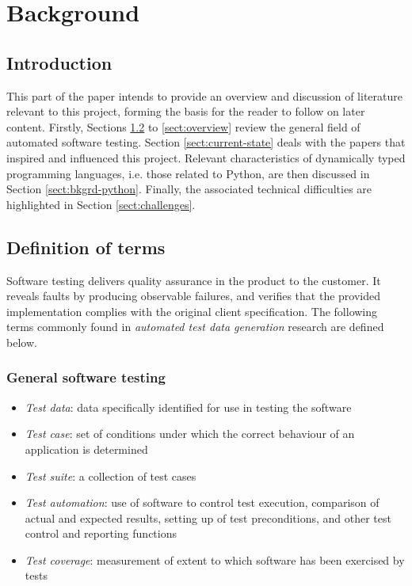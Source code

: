 \documentclass{icldt}
\numberwithin{equation}{section}       %
\newcommand{\blankpage}{
\newpage
\thispagestyle{empty}
\mbox{}
\newpage
}
\begin{document}
	
	\blankpage
	
	\blankpage
	
	\blankpage
	\tableofcontents
	
\chapter{Background}
\label{ch:background}
\section{Introduction}
This part of the paper intends to provide an overview and discussion of literature relevant to this project, forming the basis for the reader to follow on later content. Firstly, Sections \ref{sect:basics} to \ref{sect:overview} review the general field of automated software testing. Section \ref{sect:current-state} deals with the papers that inspired and influenced this project. Relevant characteristics of dynamically typed programming languages, i.e. those related to Python, are then discussed in Section \ref{sect:bkgrd-python}. Finally, the associated technical difficulties are highlighted in Section \ref{sect:challenges}.
\section{Definition of terms}
\label{sect:basics}
Software testing delivers quality assurance in the product to the customer. It reveals faults by producing observable failures, and verifies that the provided implementation complies with the original client specification. The following terms commonly found in \emph{automated test data generation} research are defined below.

\subsection{General software testing}
\begin{itemize}
	\item \emph{Test data}: data specifically identified for use in testing the software
	\item \emph{Test case}: set of conditions under which the correct behaviour of an application is determined
	\item \emph{Test suite}: a collection of test cases
	\item \emph{Test automation}: use of software to control test execution, comparison of actual and expected results, setting up of test preconditions, and other test control and reporting functions
	\item \emph{Test coverage}: measurement of extent to which software has been exercised by tests
\end{itemize}
\end{document}
